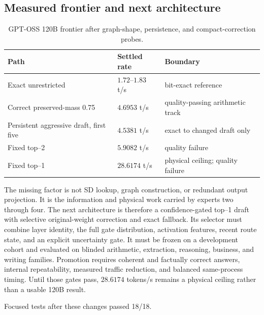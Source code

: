 \subsection{Measured frontier and next architecture}

\begin{table}[h]
\centering
\begin{tabular}{@{}lll@{}}
\toprule
Path & Settled rate & Boundary \\
\midrule
Exact unrestricted & $1.72$--$1.83$ t/s & bit-exact reference \\
Correct preserved-mass 0.75 & $4.6953$ t/s & quality-passing arithmetic track \\
Persistent aggressive draft, first five & $4.5381$ t/s & exact to changed draft only \\
Fixed top--2 & $5.9082$ t/s & quality failure \\
Fixed top--1 & $28.6174$ t/s & physical ceiling; quality failure \\
\bottomrule
\end{tabular}
\caption{GPT-OSS 120B frontier after graph-shape, persistence, and compact-correction probes.}
\end{table}

The missing factor is not SD lookup, graph construction, or redundant output
projection.  It is the information and physical work carried by experts two
through four.  The next architecture is therefore a confidence-gated top--1
draft with selective original-weight correction and exact fallback.  Its
selector must combine layer identity, the full gate distribution, activation
features, recent route state, and an explicit uncertainty gate.  It must be
frozen on a development cohort and evaluated on blinded arithmetic,
extraction, reasoning, business, and writing families.  Promotion requires
coherent and factually correct answers, internal repeatability, measured traffic
reduction, and balanced same-process timing.  Until those gates pass, $28.6174$
tokens/s remains a physical ceiling rather than a usable 120B result.

Focused tests after these changes passed 18/18.
